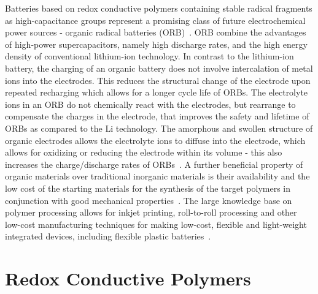 Batteries based on redox conductive polymers containing stable radical fragments as high-capacitance groups represent a promising class of future electrochemical power sources - organic radical batteries (ORB)~\cite{nakahara2002_cpl, nishide2004_electact,xie2021_mathoriz,Rohland_2021}. ORB combine the advantages of high-power supercapacitors, namely high discharge rates, and the high energy density of conventional lithium-ion technology. In contrast to the lithium-ion battery, the charging of an organic battery does not involve intercalation of metal ions into the electrodes. This reduces the structural change of the electrode upon repeated recharging which allows for a longer cycle life of ORBs. The electrolyte ions in an ORB do not chemically react with the electrodes, but rearrange to compensate the charges in the electrode, that improves the safety and lifetime of ORBs as compared to the Li technology. The amorphous and swollen structure of organic electrodes allows the electrolyte ions to diffuse into the electrode, which allows for oxidizing or reducing the electrode within its volume - this also increases the charge/discharge rates of ORBs~\cite{nishide_2009}. A further beneficial property of organic materials over traditional inorganic materials is their availability and the low cost of the starting materials for the synthesis of the target polymers in conjunction with good mechanical properties~\cite{janoschka2012_advmater, muench2016_chemrev, friebe2017_topcurrchem}. The large knowledge base on polymer processing allows for inkjet printing, roll-to-roll processing and other low-cost manufacturing techniques for making low-cost, flexible and light-weight integrated devices, including flexible plastic batteries~\cite{janoschka2012_advmater,nishide_2009}. 



\section{Redox Conductive Polymers}

